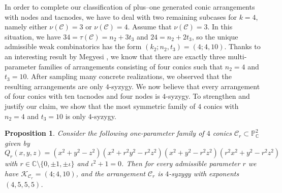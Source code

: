 \documentclass[11pt]{article}
\theoremstyle{plain}
\newtheorem{proposition}[thm]{Proposition}
\theoremstyle{definition}
\begin{document}
 In order to complete our classification of plus--one generated conic arrangements with nodes and tacnodes, we have to deal with two remaining subcases for $k=4$, namely either $\nu(\mathcal{C})=3$ or $\nu(\mathcal{C})=4$. Assume that $\nu(\mathcal{C}) = 3$. In this situation, we have  $34 = \tau(\mathcal{C}) = n_{2}+3t_{3}$ and $24 = n_{2}+2t_{3}$, so the unique admissible weak combinatorics has the form $(k_{2};n_{2},t_{3}) = (4; 4, 10)$. Thanks to an interesting result by Megyesi \cite{GM}, we know that there are exactly three multi-parameter families of arrangements consisting of four conics such that $n_{2}=4$ and $t_{3}=10$. After sampling many concrete realizations, we observed that the resulting arrangements are only $4$-syzygy. We now believe that every arrangement of four conics with ten tacnodes and four nodes is $4$-syzygy. To strengthen and justify our claim, we show that the most symmetric family of $4$ conics with $n_2 = 4$ and $t_3 = 10$ is only $4$-syzygy.
\begin{proposition}
\label{con4}
Consider the following one-parameter family of $4$ conics $\mathcal{C}_{r} \subset \mathbb{P}^{2}_{\mathbb{C}}$ given by
$$Q_{r}(x,y,z) = (x^2+y^2-z^2)(x^2+r^2 y^2 - r^2 z^2)(x^2+y^2-r^2 z^2)(r^2 x^2+y^2-r^2 z^2)$$
with $r \in \mathbb{C} \setminus \{0, \pm 1, \pm \iota\}$ and $\iota^{2}+1=0$. 
Then for every admissible parameter $r$ we have $\mathcal{K}_{\mathcal{C}_{r}}=(4;4,10)$, and the arrangement $\mathcal{C}_{r}$ is $4$-syzygy with exponents $(4,5,5,5)$.
\end{proposition}
\end{document}
